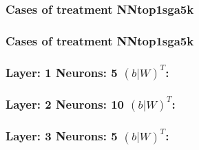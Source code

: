 \documentclass[18pt,c]{beamer}
\begin{document}
 \begin{frame}
 \fontsize{8pt}{9pt}\selectfont
 \frametitle{ Cases of treatment NNtop1sga5k }

 \label{ExpDSolutionTable009.tex}  
 \end{frame}

 \begin{frame}
 \fontsize{8pt}{9pt}\selectfont
 \frametitle{ Cases of treatment NNtop1sga5k }

 \label{ExpDSolutionTable010.tex}  
 \end{frame}


 \begin{frame}
 \fontsize{8pt}{9pt}\selectfont
 \frametitle{ Layer: 1 Neurons: 5  $(b|W)^T$: 
 }

 \label{ExpDNNWeightTable009.tex}  
 \end{frame}


 \begin{frame}
 \fontsize{8pt}{9pt}\selectfont
 \frametitle{ Layer: 2 Neurons: 10  $(b|W)^T$: 
 }

 \label{ExpDNNWeightTable010.tex}  
 \end{frame}


 \begin{frame}
 \fontsize{8pt}{9pt}\selectfont
 \frametitle{ Layer: 3 Neurons: 5  $(b|W)^T$: 
 }

 \label{ExpDNNWeightTable011.tex}  
 \end{frame}
\end{document}
